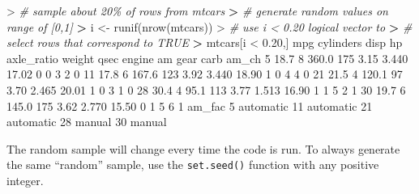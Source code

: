 \documentclass[
]{book}
\newenvironment{Shaded}{\begin{snugshade}}{\end{snugshade}}
\newcommand{\CommentTok}[1]{\textcolor[rgb]{0.56,0.35,0.01}{\textit{#1}}}
\newcommand{\DecValTok}[1]{\textcolor[rgb]{0.00,0.00,0.81}{#1}}
\newcommand{\ErrorTok}[1]{\textcolor[rgb]{0.64,0.00,0.00}{\textbf{#1}}}
\newcommand{\FloatTok}[1]{\textcolor[rgb]{0.00,0.00,0.81}{#1}}
\newcommand{\FunctionTok}[1]{\textcolor[rgb]{0.00,0.00,0.00}{#1}}
\newcommand{\NormalTok}[1]{#1}
\newcommand{\OtherTok}[1]{\textcolor[rgb]{0.56,0.35,0.01}{#1}}
\newcommand{\SpecialCharTok}[1]{\textcolor[rgb]{0.00,0.00,0.00}{#1}}
\begin{document}
\begin{Shaded}
\begin{Highlighting}[]
\SpecialCharTok{\textgreater{}} \CommentTok{\# sample about 20\% of rows from mtcars}
\ErrorTok{\textgreater{}} \CommentTok{\# generate random values on range of [0,1]}
\ErrorTok{\textgreater{}}\NormalTok{ i }\OtherTok{\textless{}{-}} \FunctionTok{runif}\NormalTok{(}\FunctionTok{nrow}\NormalTok{(mtcars))}
\SpecialCharTok{\textgreater{}} \CommentTok{\# use i \textless{} 0.20 logical vector to }
\ErrorTok{\textgreater{}} \CommentTok{\# select rows that correspond to TRUE}
\ErrorTok{\textgreater{}}\NormalTok{ mtcars[i }\SpecialCharTok{\textless{}} \FloatTok{0.20}\NormalTok{,]}
\NormalTok{    mpg cylinders  disp  hp axle\_ratio weight  qsec engine am gear carb am\_ch}
\DecValTok{5}  \FloatTok{18.7}         \DecValTok{8} \FloatTok{360.0} \DecValTok{175}       \FloatTok{3.15}  \FloatTok{3.440} \FloatTok{17.02}      \DecValTok{0}  \DecValTok{0}    \DecValTok{3}    \DecValTok{2}     \DecValTok{0}
\DecValTok{11} \FloatTok{17.8}         \DecValTok{6} \FloatTok{167.6} \DecValTok{123}       \FloatTok{3.92}  \FloatTok{3.440} \FloatTok{18.90}      \DecValTok{1}  \DecValTok{0}    \DecValTok{4}    \DecValTok{4}     \DecValTok{0}
\DecValTok{21} \FloatTok{21.5}         \DecValTok{4} \FloatTok{120.1}  \DecValTok{97}       \FloatTok{3.70}  \FloatTok{2.465} \FloatTok{20.01}      \DecValTok{1}  \DecValTok{0}    \DecValTok{3}    \DecValTok{1}     \DecValTok{0}
\DecValTok{28} \FloatTok{30.4}         \DecValTok{4}  \FloatTok{95.1} \DecValTok{113}       \FloatTok{3.77}  \FloatTok{1.513} \FloatTok{16.90}      \DecValTok{1}  \DecValTok{1}    \DecValTok{5}    \DecValTok{2}     \DecValTok{1}
\DecValTok{30} \FloatTok{19.7}         \DecValTok{6} \FloatTok{145.0} \DecValTok{175}       \FloatTok{3.62}  \FloatTok{2.770} \FloatTok{15.50}      \DecValTok{0}  \DecValTok{1}    \DecValTok{5}    \DecValTok{6}     \DecValTok{1}
\NormalTok{      am\_fac}
\DecValTok{5}\NormalTok{  automatic}
\DecValTok{11}\NormalTok{ automatic}
\DecValTok{21}\NormalTok{ automatic}
\DecValTok{28}\NormalTok{    manual}
\DecValTok{30}\NormalTok{    manual}
\end{Highlighting}
\end{Shaded}

The random sample will change every time the code is run. To always generate the same ``random'' sample, use the \texttt{set.seed()} function with any positive integer.
\end{document}
